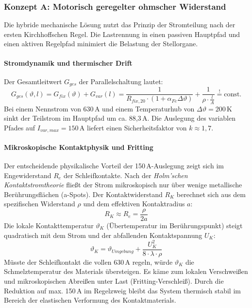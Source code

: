 \subsubsection{Konzept A: Motorisch geregelter ohmscher Widerstand}

Die hybride mechanische Lösung nutzt das Prinzip der Stromteilung nach der ersten Kirchhoffschen Regel. Die Lastrennung in einen passiven Hauptpfad und einen aktiven Regelpfad minimiert die Belastung der Stellorgane.
\paragraph{Stromdynamik und thermischer Drift}
Der Gesamtleitwert $G_{ges}$ der Parallelschaltung lautet:
\begin{equation}
    G_{ges}(\vartheta, l) = G_{fix}(\vartheta) + G_{var}(l) = \frac{1}{R_{fix,20} \cdot (1 + \alpha_{Fe} \Delta\vartheta)} + \frac{1}{\rho \cdot \frac{l}{A}} \stackrel{!}{=} \text{const.}
\end{equation}
Bei einem Nennstrom von 630\,A und einem Temperaturhub von $\Delta\vartheta = 200\,\text{K}$ sinkt der Teilstrom im Hauptpfad um ca. 88,3\,A. Die Auslegung des variablen Pfades auf $I_{var,max} = 150\,\text{A}$ liefert einen Sicherheitsfaktor von $k \approx 1,7$.
\paragraph{Mikroskopische Kontaktphysik und Fritting}
Der entscheidende physikalische Vorteil der 150\,A-Auslegung zeigt sich im Engewiderstand $R_e$ der Schleifkontakte. Nach der \textit{Holm'schen Kontaktstromtheorie} fließt der Strom mikroskopisch nur über wenige metallische Berührungsflächen (a-Spots). Der Kontaktwiderstand $R_K$ berechnet sich aus dem spezifischen Widerstand $\rho$ und dem effektiven Kontaktradius $a$:
\begin{equation}
    R_K \approx R_e = \frac{\rho}{2a}
\end{equation}
Die lokale Kontakttemperatur $\vartheta_K$ (Übertemperatur im Berührungspunkt) steigt quadratisch mit dem Strom und der abfallenden Kontaktspannung $U_K$:
\begin{equation}
    \vartheta_K = \vartheta_{Umgebung} + \frac{U_K^2}{8 \cdot \lambda \cdot \rho}
\end{equation}
Müsste der Schleifkontakt die vollen 630\,A regeln, würde $\vartheta_K$ die Schmelztemperatur des Materials übersteigen. Es käme zum lokalen Verschweißen und mikroskopischen Abreißen unter Last (Fritting-Verschleiß). Durch die Reduktion auf max. 150\,A im Regelzweig bleibt das System thermisch stabil im Bereich der elastischen Verformung des Kontaktmaterials.
